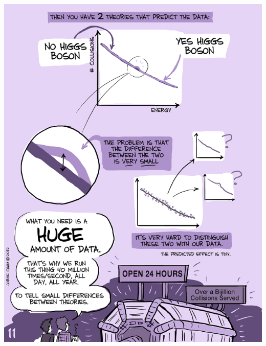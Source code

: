 \documentclass{beamer}
\begin{document}
\begin{frame}
{\begin{columns}
\begin{column}{0.55\textwidth}
            \includegraphics[width=\textwidth]{figures/phd3.png}\\


\end{column}
\end{columns}}
\end{frame}
\end{document}
